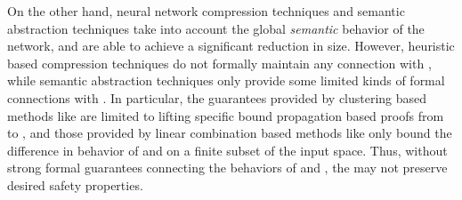 On the other hand, neural network compression techniques \cite{dnn-compression}
and semantic abstraction techniques \cite{deep-abstract,lin-comb-abs-jan} take
into account the global \textit{semantic} behavior of the network, and are able
to achieve a significant reduction in size.
However, heuristic based compression techniques \cite{dnn-compression} do not
formally maintain any connection with \cnc, while semantic abstraction
\cite{deep-abstract,lin-comb-abs-jan} techniques only provide some limited
kinds of formal connections with \cnc. 
In particular, the guarantees provided by clustering based methods like
\cite{deep-abstract} are limited to lifting specific bound propagation based
proofs from \abs to \cnc, 
and those provided by linear combination based methods like
\cite{lin-comb-abs-jan} only bound the difference in behavior of \abs and \cnc
on a finite subset of the input space.
Thus, without strong formal guarantees connecting the behaviors of \abs and
\cnc, the \abs may not preserve desired safety properties.



